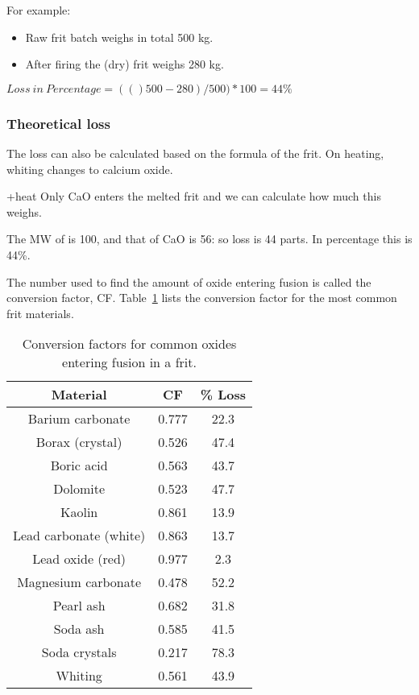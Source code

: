 For example:
\begin{itemize}
\item Raw frit batch weighs in total 500 kg.
\item After firing the (dry) frit weighs 280 kg.
\end{itemize}

$Loss~in~Percentage=(()500-280)/500)*100=44\%$

\subsubsection{Theoretical loss}
The loss can also be calculated based on the formula of the frit. On heating, 
whiting changes to calcium oxide.

+heat
Only CaO enters the melted frit and we can calculate how much this weighs.

The MW of  is 100, and that of CaO is 56: so loss is 44 parts. In 
percentage this is 44\%.

The number used to find the amount of oxide entering fusion is called the 
conversion factor, CF. Table~\ref{tab:fritconversionfactors} lists the 
conversion factor for the most common frit materials.
\begin{center}
  \renewcommand{\arraystretch}{1.5}
  \begin{table}\centering
    \begin{tabular}{|c|c|c|}\hline
      \textbf{Material}&\textbf{CF}&\textbf{\% Loss}\\\hline\hline
      Barium carbonate&0.777&22.3\\\hline
      Borax (crystal)&0.526&47.4\\\hline
      Boric acid&0.563&43.7\\\hline
      Dolomite&0.523&47.7\\\hline
      Kaolin&0.861&13.9\\\hline
      Lead carbonate (white)&0.863&13.7\\\hline
      Lead oxide (red)&0.977&2.3\\\hline
      Magnesium carbonate&0.478&52.2\\\hline
      Pearl ash&0.682&31.8\\\hline
      Soda ash&0.585&41.5\\\hline
      Soda crystals&0.217&78.3\\\hline
      Whiting&0.561&43.9\\\hline
    \end{tabular}
    \caption{Conversion factors for common oxides entering fusion in a frit.}
    \label{tab:fritconversionfactors}
  \end{table}
\end{center}
